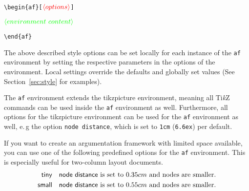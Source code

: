 \documentclass[headings=normal]{scrartcl}
\newcommand{\tikzname}{Ti\emph{k}Z\xspace}
\newcommand{\opt}[2][red]{\ensuremath{\textcolor{#1}{\langle #2\rangle}}}
\newtheorem{example}{Example}
\begin{document}
\vspace{-0.2cm}
\noindent
\verb|\begin{af}[|\opt{options}\verb|]|

\opt[green]{environment~content}

\noindent
\verb|\end{af}|

\begin{list}{}{\leftmargin=\parindent\rightmargin=0pt}
    \item
    The above described style options can be set locally for each instance of the \texttt{af} environment by setting the respective parameters in the options of the environment.
    Local settings override the defaults and globally set values (See Section~\ref{sec:style} 
 for examples).
    
    The \texttt{af} environment extends the \textsf{tikzpicture} environment, meaning all \tikzname commands can be used inside the \texttt{af} environment as well.
    Furthermore, all options for the \textsf{tikzpicture} environment can be used for the \texttt{af} environment as well, e.\,g the option \verb|node distance|, which is set to \verb|1cm| (\verb|6.6ex|) per default.

    If you want to create an argumentation framework with limited space available, you can use one of the following predefined options for the \texttt{af} environment. 
    This is especially useful for two-column layout documents.
    \begin{align*}
        \mathsf{tiny} &\quad \text{\textsf{node distance} is set to $0.35cm$ and nodes are smaller.}\\
        \mathsf{small} &\quad \text{\textsf{node distance} is set to $0.55cm$ and nodes are smaller.}
    \end{align*}

\end{list}
\end{document}
